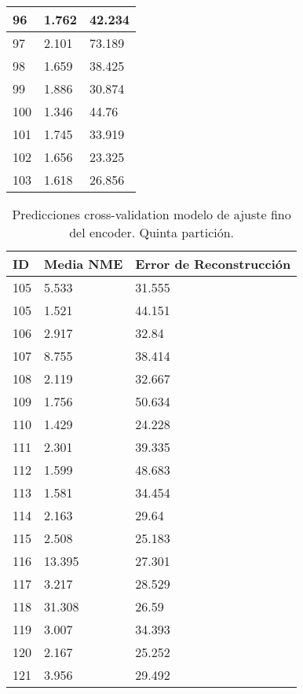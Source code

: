 \begin{table}[!ht]
\begin{tabular}{|l|l|l|}
        96 & 1.762 & 42.234 \\ \hline
        97 & 2.101 & 73.189 \\ \hline
        98 & 1.659 & 38.425 \\ \hline
        99 & 1.886 & 30.874 \\ \hline
        100 & 1.346 & 44.76 \\ \hline
        101 & 1.745 & 33.919 \\ \hline
        102 & 1.656 & 23.325 \\ \hline
        103 & 1.618 & 26.856 \\ \hline
    \end{tabular}
\end{table}


\begin{table}[!ht]
    \centering
    \caption{Predicciones cross-validation modelo de ajuste fino del encoder. Quinta partición.}
    \begin{tabular}{|l|l|l|}
    \hline
    \cellcolor{gray!25}\textbf{ID} & \cellcolor{gray!25}\textbf{Media NME} & \cellcolor{gray!25}\textbf{Error de Reconstrucción} \\ \hline
        105 & 5.533 & 31.555 \\ \hline
        105 & 1.521 & 44.151 \\ \hline
        106 & 2.917 & 32.84 \\ \hline
        107 & 8.755 & 38.414 \\ \hline
        108 & 2.119 & 32.667 \\ \hline
        109 & 1.756 & 50.634 \\ \hline
        110 & 1.429 & 24.228 \\ \hline
        111 & 2.301 & 39.335 \\ \hline
        112 & 1.599 & 48.683 \\ \hline
        113 & 1.581 & 34.454 \\ \hline
        114 & 2.163 & 29.64 \\ \hline
        115 & 2.508 & 25.183 \\ \hline
        116 & 13.395 & 27.301 \\ \hline
        117 & 3.217 & 28.529 \\ \hline
        118 & 31.308 & 26.59 \\ \hline
        119 & 3.007 & 34.393 \\ \hline
        120 & 2.167 & 25.252 \\ \hline
        121 & 3.956 & 29.492 \\ \hline

\end{tabular}
\end{table}
